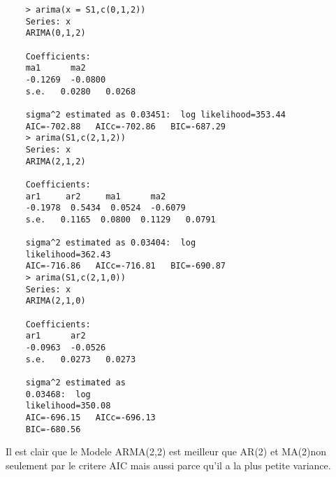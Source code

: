     \begin{verbatim}
    > arima(x = S1,c(0,1,2))
    Series: x 
    ARIMA(0,1,2)                    

    Coefficients:
    ma1      ma2
    -0.1269  -0.0800
    s.e.   0.0280   0.0268

    sigma^2 estimated as 0.03451:  log likelihood=353.44
    AIC=-702.88   AICc=-702.86   BIC=-687.29
    > arima(S1,c(2,1,2))
    Series: x 
    ARIMA(2,1,2)                    

    Coefficients:
    ar1     ar2     ma1      ma2
    -0.1978  0.5434  0.0524  -0.6079
    s.e.   0.1165  0.0800  0.1129   0.0791

    sigma^2 estimated as 0.03404:  log
    likelihood=362.43
    AIC=-716.86   AICc=-716.81   BIC=-690.87
    > arima(S1,c(2,1,0))
    Series: x 
    ARIMA(2,1,0)                    

    Coefficients:
    ar1      ar2
    -0.0963  -0.0526
    s.e.   0.0273   0.0273

    sigma^2 estimated as
    0.03468:  log
    likelihood=350.08
    AIC=-696.15   AICc=-696.13
    BIC=-680.56
    \end{verbatim}

    Il est clair que le Modele ARMA(2,2) est meilleur que AR(2) et MA(2)non
    seulement par le
    critere AIC mais aussi parce qu'il a la plus petite variance.



    
   

    


    
